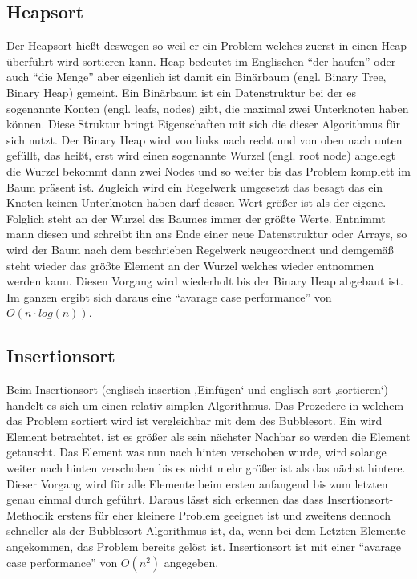 \subsection{Heapsort}
Der Heapsort hießt deswegen so weil er ein Problem welches zuerst in einen Heap überführt wird sortieren kann. Heap bedeutet im Englischen 
"`der haufen"'  oder auch  "`die Menge"' aber eigenlich ist damit ein Binärbaum (engl. Binary Tree, Binary Heap) gemeint. Ein Binärbaum 
ist ein Datenstruktur bei der es sogenannte Konten (engl. leafs, nodes) gibt, die maximal zwei Unterknoten haben können. 
Diese Struktur bringt Eigenschaften mit sich die dieser Algorithmus für sich nutzt. Der Binary Heap wird von links nach recht und von oben nach
unten gefüllt, das heißt, erst wird einen sogenannte Wurzel (engl. root node) angelegt die Wurzel bekommt dann zwei Nodes
und so weiter bis das Problem komplett im Baum präsent ist. Zugleich wird ein Regelwerk umgesetzt das besagt das ein Knoten keinen Unterknoten
haben darf dessen Wert größer ist als der eigene. Folglich steht an der Wurzel des Baumes immer der größte Werte. Entnimmt mann diesen und
schreibt ihn ans Ende einer neue Datenstruktur oder Arrays, so wird der
Baum nach dem beschrieben Regelwerk neugeordnent und demgemäß steht wieder das größte Element an der Wurzel welches wieder entnommen werden kann.
Diesen Vorgang wird wiederholt bis der Binary Heap abgebaut ist. Im ganzen ergibt sich daraus 
eine "`avarage case performance"' von $O(n\cdot log(n))$. \parencite[vgl.][]{heapsort}

\subsection{Insertionsort}
Beim Insertionsort (englisch insertion ‚Einfügen‘ und englisch sort ‚sortieren‘) handelt es sich um einen relativ simplen Algorithmus. Das 
Prozedere in welchem das Problem sortiert wird ist vergleichbar mit dem des Bubblesort. Ein wird Element betrachtet, ist es größer als sein
nächster Nachbar so werden die Element getauscht. 
Das Element was nun nach hinten verschoben wurde, wird solange weiter nach hinten verschoben bis es nicht
mehr größer ist als das nächst hintere. Dieser Vorgang wird für alle Elemente beim ersten anfangend bis zum letzten genau einmal durch geführt.
Daraus lässt sich erkennen das dass Insertionsort-Methodik
erstens für eher kleinere Problem geeignet ist und zweitens dennoch schneller als der Bubblesort-Algorithmus ist,
da, wenn bei dem Letzten Elemente angekommen, das Problem bereits gelöst ist. 
Insertionsort ist mit einer "`avarage case performance"' von $O(n^2)$ angegeben.\parencite[vgl.][]{insertionsort}

